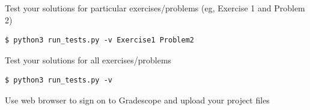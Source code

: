 \documentclass[8pt,a4paper,compress]{beamer}
\newlength{\myMheight}
\begin{document}
\begin{frame}[fragile]
\pause

Test your solutions for particular exercises/problems (eg, Exercise 1 and Problem 2)

\begin{tcolorbox}[enhanced,drop shadow southwest,sharp corners,size=fbox,colback=black]
\begin{lstlisting}[style=terminal]
$ python3 run_tests.py -v Exercise1 Problem2
\end{lstlisting}
\end{tcolorbox}

\pause\bigskip

Test your solutions for all exercises/problems

\begin{tcolorbox}[enhanced,drop shadow southwest,sharp corners,size=fbox,colback=black]
\begin{lstlisting}[style=terminal]
$ python3 run_tests.py -v
\end{lstlisting}
\end{tcolorbox}

\pause\bigskip

Use web browser  to sign on to Gradescope and upload your project files
\end{frame}
\end{document}

